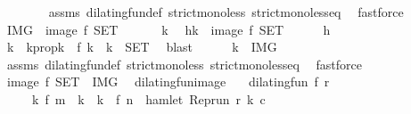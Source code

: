 \begin{isabellebody}
\ \ \ \ \ \ \isamarkupfalse%
\ assms\ dilating{\isacharunderscore}fun{\isacharunderscore}def\ strict{\isacharunderscore}mono{\isacharunderscore}less\ strict{\isacharunderscore}mono{\isacharunderscore}less{\isacharunderscore}eq\ \isamarkupfalse%
\ fastforce\isanewline
\ \ \isacommand{{\isacharbraceright}}\isamarkupfalse%
\ \isamarkupfalse%
\ {\isacartoucheopen}{\isacharquery}IMG\ {\isasymsubseteq}\ image\ f\ {\isacharquery}SET{\isacartoucheclose}\ \isacommand{{\isachardot}{\isachardot}}\isamarkupfalse%
\isanewline
{}\isamarkupfalse%
\isanewline
\ \ \isacommand{{\isacharbraceleft}}\isamarkupfalse%
\ \isamarkupfalse%
\ k\ \isamarkupfalse%
\ h{\isacharcolon}{\isacartoucheopen}k\ {\isasymin}\ image\ f\ {\isacharquery}SET{\isacartoucheclose}\isanewline
\ \ \ \ \isamarkupfalse%
\ h\ \isamarkupfalse%
\ k\ \ k{}prop{\isacharcolon}{\isacartoucheopen}k\ {\isacharequal}\ f\ k\ {\isasymand}\ k\ {\isasymin}\ {\isacharquery}SET{\isacartoucheclose}\ \isamarkupfalse%
\ blast\isanewline
\ \ \ \ \isamarkupfalse%
\ {\isacartoucheopen}k\ {\isasymin}\ {\isacharquery}IMG{\isacartoucheclose}\isanewline
\ \ \ \ \ \ \isamarkupfalse%
\ assms\ dilating{\isacharunderscore}fun{\isacharunderscore}def\ strict{\isacharunderscore}mono{\isacharunderscore}less\ strict{\isacharunderscore}mono{\isacharunderscore}less{\isacharunderscore}eq\ \isamarkupfalse%
\ fastforce\isanewline
\ \ \isacommand{{\isacharbraceright}}\isamarkupfalse%
\ \isamarkupfalse%
\ {\isacartoucheopen}image\ f\ {\isacharquery}SET\ {\isasymsubseteq}\ {\isacharquery}IMG{\isacartoucheclose}\ \isacommand{{\isachardot}{\isachardot}}\isamarkupfalse%
\isanewline
{}\isamarkupfalse%
%
\endisatagproof
{\isafoldproof}%
%
\isadelimproof
\isanewline
%
\endisadelimproof
\isanewline
{}\isamarkupfalse%
\ dilating{\isacharunderscore}fun{\isacharunderscore}image{\isacharcolon}\isanewline
\ \ \ {\isacartoucheopen}dilating{\isacharunderscore}fun\ f\ r{\isacartoucheclose}\isanewline
\ \ \ \ \ {\isacartoucheopen}{\isacharbraceleft}k{\isachardot}\ f\ m\ {\isasymle}\ k\ {\isasymand}\ k\ {\isasymle}\ f\ n\ {\isasymand}\ hamlet\ {\isacharparenleft}{\isacharparenleft}Rep{\isacharunderscore}run\ r{\isacharparenright}\ k\ c{\isacharparenright}{\isacharbraceright}\isanewline

\end{isabellebody}
